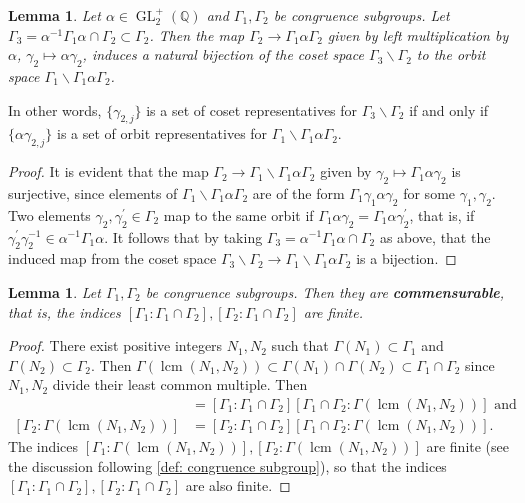 \documentclass[10pt,leqno,twoside]{article}
\theoremstyle{plain}
\newtheorem{lemma}[lem]{Lemma}
\theoremstyle{definition}
\numberwithin{equation}{section}
\numberwithin{lem}{section}
\newcommand{\textib}[1]{\textbf{\textit{#1\index{#1}}}} %
\DeclareMathOperator{\GL}{GL}
\newcommand{\glqp}{\GL_2^+(\mathbb{Q})}
\DeclareMathOperator{\lcm}{lcm}
\begin{document}
\begin{lemma}\label{lem: double coset coset/orbit spaces}
    Let $\alpha\in\glqp$ and $\varGamma_1,\varGamma_2$ be congruence subgroups. Let $\varGamma_3 = \alpha^{-1}\varGamma_1\alpha\cap \varGamma_2\subset \varGamma_2$. Then the map $\varGamma_2\to \varGamma_1\alpha\varGamma_2$ given by left multiplication by $\alpha$, $\gamma_2\mapsto\alpha\gamma_2$, induces a natural bijection of the coset space $\varGamma_3\backslash\varGamma_2$ to the orbit space $\varGamma_1\backslash\varGamma_1\alpha\varGamma_2$.
\end{lemma} In other words, $\{\gamma_{2,j}\}$ is a set of coset representatives for $\varGamma_3\backslash \varGamma_2$ if and only if $\{\alpha\gamma_{2,j}\}$ is a set of orbit representatives for $\varGamma_1\backslash \varGamma_1\alpha\varGamma_2$.
\begin{proof}
    It is evident that the map $\varGamma_2\to \varGamma_1\backslash\varGamma_1\alpha\varGamma_2$ given by $\gamma_2\mapsto \varGamma_1\alpha\gamma_2$ is surjective, since elements of $\varGamma_1\backslash\varGamma_1\alpha\varGamma_2$ are of the form $\varGamma_1\gamma_1\alpha\gamma_2$ for some $\gamma_1,\gamma_2$. Two elements $\gamma_2,\gamma_2^\prime\in\varGamma_2$ map to the same orbit if $\varGamma_1\alpha\gamma_2 = \varGamma_1\alpha\gamma_2^\prime$, that is, if $\gamma_2^\prime\gamma_2^{-1}\in \alpha^{-1}\varGamma_1\alpha$. It follows that by taking $\varGamma_3 = \alpha^{-1}\varGamma_1\alpha\cap \varGamma_2$ as above, that the induced map from the coset space $\varGamma_3\backslash\varGamma_2\to \varGamma_1\backslash \varGamma_1\alpha\varGamma_2$ is a bijection.
\end{proof}
\begin{lemma}\label{lem: congruence subgroups commensurable}
    Let $\varGamma_1,\varGamma_2$ be congruence subgroups. Then they are \textib{commensurable}, that is, the indices $[\varGamma_1 : \varGamma_1\cap \varGamma_2], [\varGamma_2 : \varGamma_1\cap \varGamma_2]$ are finite.
\end{lemma}
\begin{proof}
    There exist positive integers $N_1,N_2$ such that $\varGamma(N_1)\subset \varGamma_1$ and $\varGamma(N_2)\subset \varGamma_2$. Then $\varGamma(\lcm(N_1,N_2))\subset \varGamma(N_1)\cap \varGamma(N_2)\subset \varGamma_1\cap \varGamma_2$ since $N_1,N_2$ divide their least common multiple. Then \begin{align*}
        [\varGamma_1 : \varGamma(\lcm(N_1,N_2))] &= [\varGamma_1 : \varGamma_1\cap \varGamma_2][\varGamma_1\cap \varGamma_2 : \varGamma(\lcm(N_1,N_2))] \text{ and}\\
        [\varGamma_2 : \varGamma(\lcm(N_1,N_2))] &= [\varGamma_2 : \varGamma_1\cap \varGamma_2][\varGamma_1\cap \varGamma_2 : \varGamma(\lcm(N_1,N_2))].
    \end{align*} The indices $[\varGamma_1 : \varGamma(\lcm(N_1,N_2))],[\varGamma_2 : \varGamma(\lcm(N_1,N_2))]$ are finite (see the discussion following \cref{def: congruence subgroup}), so that the indices $[\varGamma_1 : \varGamma_1\cap \varGamma_2], [\varGamma_2 : \varGamma_1\cap \varGamma_2]$ are also finite.
\end{proof}
\end{document}
